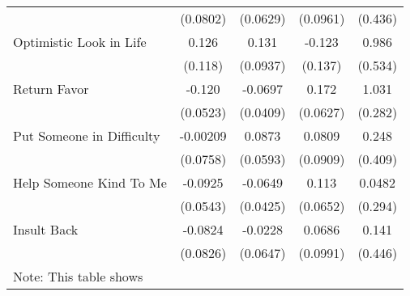 {\begin{tabular}{l*{4}{c}}
            &    (0.0802)         &    (0.0629)         &    (0.0961)         &     (0.436)         \\
[1em]
Optimistic Look in Life&       0.126         &       0.131         &      -0.123         &       0.986         \\
            &     (0.118)         &    (0.0937)         &     (0.137)         &     (0.534)         \\
[1em]
Return Favor&      -0.120\sym{*}  &     -0.0697         &       0.172\sym{**} &       1.031\sym{***}\\
            &    (0.0523)         &    (0.0409)         &    (0.0627)         &     (0.282)         \\
[1em]
Put Someone in Difficulty&    -0.00209         &      0.0873         &      0.0809         &       0.248         \\
            &    (0.0758)         &    (0.0593)         &    (0.0909)         &     (0.409)         \\
[1em]
Help Someone Kind To Me&     -0.0925         &     -0.0649         &       0.113         &      0.0482         \\
            &    (0.0543)         &    (0.0425)         &    (0.0652)         &     (0.294)         \\
[1em]
Insult Back &     -0.0824         &     -0.0228         &      0.0686         &       0.141         \\
            &    (0.0826)         &    (0.0647)         &    (0.0991)         &     (0.446)         \\
\hline\hline
\multicolumn{5}{l}{\footnotesize Note: This table shows}\\
\end{tabular}
}
